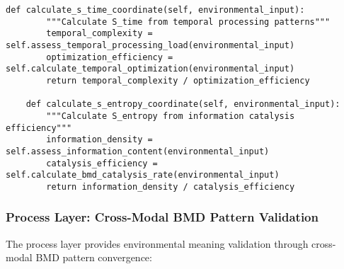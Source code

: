 \documentclass[12pt,a4paper]{article}
\begin{document}
\begin{lstlisting}[style=pythonstyle, caption=S-Entropy Algorithmic Validation]
    def calculate_s_time_coordinate(self, environmental_input):
        """Calculate S_time from temporal processing patterns"""
        temporal_complexity = self.assess_temporal_processing_load(environmental_input)
        optimization_efficiency = self.calculate_temporal_optimization(environmental_input)
        return temporal_complexity / optimization_efficiency
    
    def calculate_s_entropy_coordinate(self, environmental_input):
        """Calculate S_entropy from information catalysis efficiency"""
        information_density = self.assess_information_content(environmental_input)
        catalysis_efficiency = self.calculate_bmd_catalysis_rate(environmental_input)
        return information_density / catalysis_efficiency
\end{lstlisting}

\subsubsection{Process Layer: Cross-Modal BMD Pattern Validation}

The process layer provides environmental meaning validation through cross-modal BMD pattern convergence:
\end{document}
